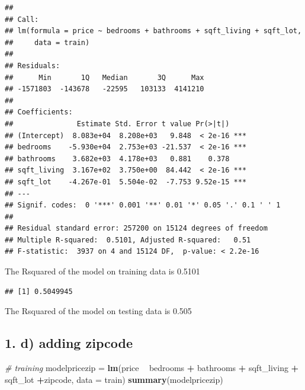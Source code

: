 \documentclass[
]{article}
\newenvironment{Shaded}{\begin{snugshade}}{\end{snugshade}}
\newcommand{\CommentTok}[1]{\textcolor[rgb]{0.56,0.35,0.01}{\textit{#1}}}
\newcommand{\DataTypeTok}[1]{\textcolor[rgb]{0.13,0.29,0.53}{#1}}
\newcommand{\DecValTok}[1]{\textcolor[rgb]{0.00,0.00,0.81}{#1}}
\newcommand{\KeywordTok}[1]{\textcolor[rgb]{0.13,0.29,0.53}{\textbf{#1}}}
\newcommand{\NormalTok}[1]{#1}
\newcommand{\OperatorTok}[1]{\textcolor[rgb]{0.81,0.36,0.00}{\textbf{#1}}}
\newcommand{\StringTok}[1]{\textcolor[rgb]{0.31,0.60,0.02}{#1}}
\begin{document}
\begin{verbatim}
## 
## Call:
## lm(formula = price ~ bedrooms + bathrooms + sqft_living + sqft_lot, 
##     data = train)
## 
## Residuals:
##      Min       1Q   Median       3Q      Max 
## -1571803  -143678   -22595   103133  4141210 
## 
## Coefficients:
##               Estimate Std. Error t value Pr(>|t|)    
## (Intercept)  8.083e+04  8.208e+03   9.848  < 2e-16 ***
## bedrooms    -5.930e+04  2.753e+03 -21.537  < 2e-16 ***
## bathrooms    3.682e+03  4.178e+03   0.881    0.378    
## sqft_living  3.167e+02  3.750e+00  84.442  < 2e-16 ***
## sqft_lot    -4.267e-01  5.504e-02  -7.753 9.52e-15 ***
## ---
## Signif. codes:  0 '***' 0.001 '**' 0.01 '*' 0.05 '.' 0.1 ' ' 1
## 
## Residual standard error: 257200 on 15124 degrees of freedom
## Multiple R-squared:  0.5101, Adjusted R-squared:   0.51 
## F-statistic:  3937 on 4 and 15124 DF,  p-value: < 2.2e-16
\end{verbatim}

The Rsquared of the model on training data is 0.5101

\begin{Shaded}
\end{Shaded}

\begin{verbatim}
## [1] 0.5049945
\end{verbatim}

The Rsquared of the model on testing data is 0.505

\hypertarget{d-adding-zipcode}{%
\subsection{1. d) adding zipcode}\label{d-adding-zipcode}}

\begin{Shaded}
\begin{Highlighting}[]
\CommentTok{# training}
\NormalTok{modelpricezip =}\StringTok{ }\KeywordTok{lm}\NormalTok{(price }\OperatorTok{~}\StringTok{ }\NormalTok{bedrooms }\OperatorTok{+}\StringTok{ }\NormalTok{bathrooms }\OperatorTok{+}\StringTok{ }\NormalTok{sqft_living }\OperatorTok{+}\StringTok{ }\NormalTok{sqft_lot }\OperatorTok{+}\NormalTok{zipcode, }\DataTypeTok{data =}\NormalTok{ train)}
\KeywordTok{summary}\NormalTok{(modelpricezip)}
\end{Highlighting}
\end{Shaded}
\end{document}
